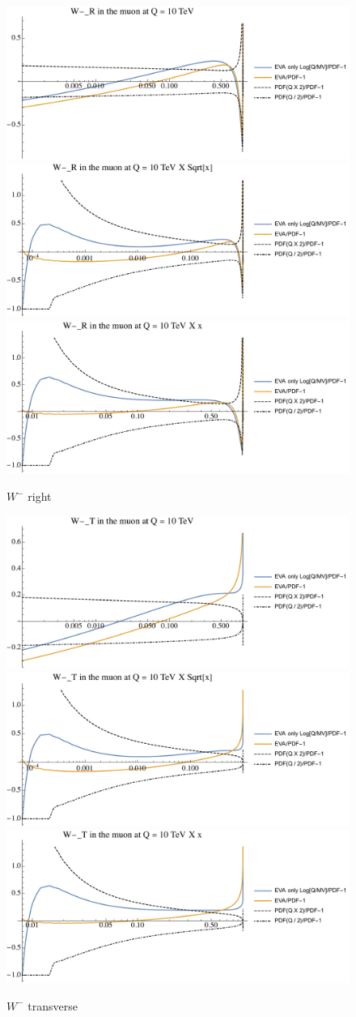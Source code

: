 \documentclass[a4paper,11pt]{article}
\begin{document}
\begin{figure}[!b]
\includegraphics[width=0.46\linewidth]{Notebooks/PlotPDFs/ratios/10TeV/W-_R_Q.pdf}
\includegraphics[width=0.46\linewidth]{Notebooks/PlotPDFs/ratios/10TeV/W-_R_Qsqrtx.pdf}
\includegraphics[width=0.46\linewidth]{Notebooks/PlotPDFs/ratios/10TeV/W-_R_Qx.pdf}
\caption{$W^-$ right}
\end{figure}

\begin{figure}[!b]
\includegraphics[width=0.46\linewidth]{Notebooks/PlotPDFs/ratios/10TeV/W-_T_Q.pdf}
\includegraphics[width=0.46\linewidth]{Notebooks/PlotPDFs/ratios/10TeV/W-_T_Qsqrtx.pdf}
\includegraphics[width=0.46\linewidth]{Notebooks/PlotPDFs/ratios/10TeV/W-_T_Qx.pdf}
\caption{$W^-$ transverse}
\end{figure}
\end{document}

